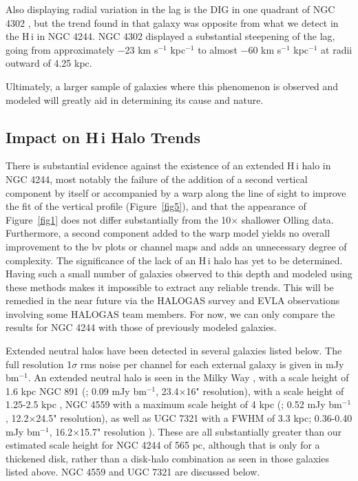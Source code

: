 \documentclass{emulateapj}
\begin{document}
\par
     Also displaying radial variation in the lag is the DIG in one quadrant of NGC 4302 \citep{2007ApJ...663..933H}, but the trend found in that galaxy was opposite from what we detect in the {\sc H\,i} in NGC 4244.  NGC 4302 displayed a substantial steepening of the lag, going from approximately $-$23 km s$^{-1}$ kpc$^{-1}$ to almost $-$60 km s$^{-1}$ kpc$^{-1}$ at radii outward of 4.25 kpc.

\par
     Ultimately, a larger sample of galaxies where this phenomenon is observed and modeled will greatly aid in determining its cause and nature.



\subsection{Impact on {\sc H\,i} Halo Trends} \label{Section6.3}

\par
    There is substantial evidence against the existence of an extended {\sc H\,i} halo in NGC 4244, most notably the failure of the addition of a second vertical component by itself or accompanied by a warp along the line of sight to improve the fit of the vertical profile (Figure~\ref{fig5}), and that the appearance of Figure~\ref{fig1} does not differ substantially from the 10$\times$ shallower Olling data. Furthermore, a second component added to the warp model yields no overall improvement to the bv plots or channel maps and adds an unnecessary degree of complexity. The significance of the lack of an {\sc H\,i} halo has yet to be determined.  Having such a small number of galaxies observed to this depth and modeled using these methods makes it impossible to extract any reliable trends.  This will be remedied in the near future via the HALOGAS survey and EVLA observations involving some HALOGAS team members.  For now, we can only compare the results for NGC 4244 with those of previously modeled galaxies.

\par
     Extended neutral halos have been detected in several galaxies listed below. The full resolution 1$\sigma$ rms noise per channel for each external galaxy is given in mJy bm$^{-1}$. An extended neutral halo is seen in the Milky Way \citep{2008ApJ...679.1288L}, with a scale height of 1.6 kpc \citep{2010arXiv1010.3563M} NGC 891 (\citealt{1997ApJ...491..140S}; 0.09 mJy bm$^{-1}$, 23.4$\times$16" resolution), with a scale height of 1.25-2.5 kpc \citep{2007AJ....134.1019O}, NGC 4559 with a maximum scale height of 4 kpc (\citealt{2005A&A...439..947B}; 0.52 mJy bm$^{-1}$, 12.2$\times$24.5" resolution), as well as UGC 7321 \citep{2003ApJ...593..721M} with a FWHM of 3.3 kpc; 0.36-0.40 mJy bm$^{-1}$, 16.2$\times$15.7" resolution \citealt{2003AJ....125.2455U}).  These are all substantially greater than our estimated scale height for NGC 4244 of 565 pc, although that is only for a thickened disk, rather than a disk-halo combination as seen in those galaxies listed above.  NGC 4559 and UGC 7321 are discussed below.  
     
\end{document}
